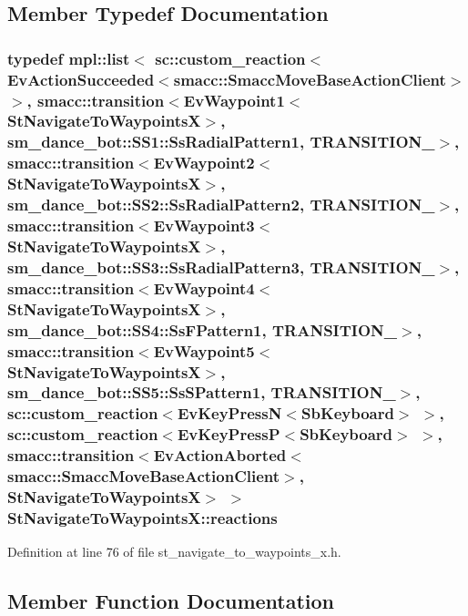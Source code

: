 \subsection{Member Typedef Documentation}
\subsubsection[{\texorpdfstring{reactions}{reactions}}]{\setlength{\rightskip}{0pt plus 5cm}typedef mpl\+::list$<$ sc\+::custom\+\_\+reaction$<$Ev\+Action\+Succeeded$<${\bf smacc\+::\+Smacc\+Move\+Base\+Action\+Client}$>$ $>$, {\bf smacc\+::transition}$<${\bf Ev\+Waypoint1}$<${\bf St\+Navigate\+To\+WaypointsX}$>$, {\bf sm\+\_\+dance\+\_\+bot\+::\+S\+S1\+::\+Ss\+Radial\+Pattern1}, {\bf T\+R\+A\+N\+S\+I\+T\+I\+O\+N\+\_}$>$, {\bf smacc\+::transition}$<${\bf Ev\+Waypoint2}$<${\bf St\+Navigate\+To\+WaypointsX}$>$, {\bf sm\+\_\+dance\+\_\+bot\+::\+S\+S2\+::\+Ss\+Radial\+Pattern2}, {\bf T\+R\+A\+N\+S\+I\+T\+I\+O\+N\+\_}$>$, {\bf smacc\+::transition}$<${\bf Ev\+Waypoint3}$<${\bf St\+Navigate\+To\+WaypointsX}$>$, {\bf sm\+\_\+dance\+\_\+bot\+::\+S\+S3\+::\+Ss\+Radial\+Pattern3}, {\bf T\+R\+A\+N\+S\+I\+T\+I\+O\+N\+\_}$>$, {\bf smacc\+::transition}$<${\bf Ev\+Waypoint4}$<${\bf St\+Navigate\+To\+WaypointsX}$>$, {\bf sm\+\_\+dance\+\_\+bot\+::\+S\+S4\+::\+Ss\+F\+Pattern1}, {\bf T\+R\+A\+N\+S\+I\+T\+I\+O\+N\+\_}$>$, {\bf smacc\+::transition}$<${\bf Ev\+Waypoint5}$<${\bf St\+Navigate\+To\+WaypointsX}$>$, {\bf sm\+\_\+dance\+\_\+bot\+::\+S\+S5\+::\+Ss\+S\+Pattern1}, {\bf T\+R\+A\+N\+S\+I\+T\+I\+O\+N\+\_}$>$, sc\+::custom\+\_\+reaction$<$Ev\+Key\+PressN$<$Sb\+Keyboard$>$ $>$, sc\+::custom\+\_\+reaction$<$Ev\+Key\+PressP$<$Sb\+Keyboard$>$ $>$, {\bf smacc\+::transition}$<$Ev\+Action\+Aborted$<${\bf smacc\+::\+Smacc\+Move\+Base\+Action\+Client}$>$, {\bf St\+Navigate\+To\+WaypointsX}$>$ $>$ {\bf St\+Navigate\+To\+Waypoints\+X\+::reactions}}\hypertarget{structStNavigateToWaypointsX_a0dcb831647342b0c35919dac0ce6818b}{}\label{structStNavigateToWaypointsX_a0dcb831647342b0c35919dac0ce6818b}


Definition at line 76 of file st\+\_\+navigate\+\_\+to\+\_\+waypoints\+\_\+x.\+h.



\subsection{Member Function Documentation}
